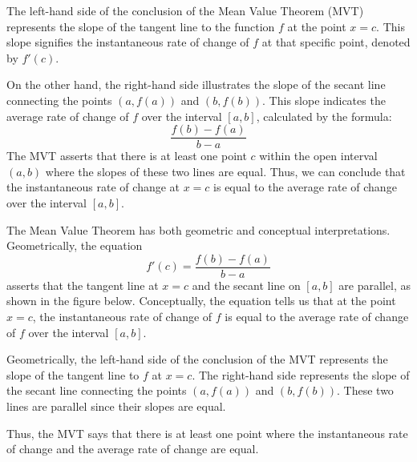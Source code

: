 \documentclass[handout]{ximera}
\begin{document}
The left-hand side of the conclusion of the Mean Value Theorem (MVT) represents the slope of the tangent 
line to the function $f$ at the point $x=c$. This slope signifies the instantaneous rate of change of $f$ at that specific point, denoted by $f'(c)$.

On the other hand, the right-hand side illustrates the slope of the secant line connecting the points 
$(a,f(a))$ and $(b,f(b))$. 
This slope indicates the average rate of change of $f$ over the interval $[a,b]$, calculated by the formula:
\[\frac{f(b) - f(a)}{b-a}\]
The MVT asserts that there is at least one point $c$ within the open interval $(a,b)$ where the slopes of these two lines are equal. 
Thus, we can conclude that the instantaneous rate of change at $x=c$ is equal to the average rate of change over the interval $[a,b]$. 

The Mean Value Theorem has both geometric and conceptual interpretations.
Geometrically, the equation
\[
f'(c) = \frac{f(b) -f(a)}{b-a}
\]
asserts that the tangent line at $x = c$ and the secant line on $[a,b]$ are parallel, as shown in the figure below.
Conceptually, the equation tells us that at the point $x=c$, the instantaneous rate of change of $f$ 
is equal to the average rate of change of $f$ over the interval $[a,b]$.

Geometrically, the left-hand side of the conclusion of the MVT represents the slope of the tangent line to $f$ at $x = c$.
The right-hand side represents the slope of the secant line connecting the points $(a, f(a))$ and $(b, f(b))$. 
These two lines are parallel since their slopes are equal.

Thus, the MVT says that there is at least one point where the instantaneous rate of change and the average rate of change are equal.

\begin{image}
\end{image}
\end{document}
